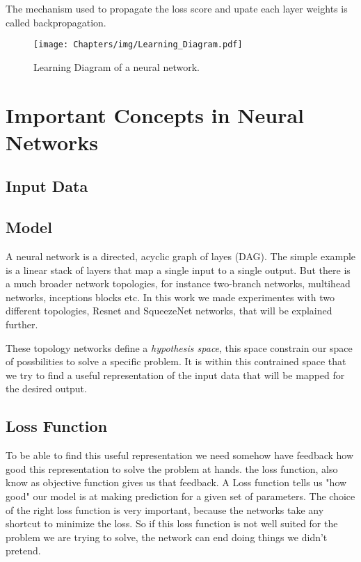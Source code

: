 The mechanism used to propagate the loss score and upate each layer weights is called backpropagation.

\begin{figure}[H]
    \centering
    \texttt{[image: Chapters/img/Learning\_Diagram.pdf]}
    \caption{Learning Diagram of a neural network.}
    \label{fig:learning_diagram}
\end{figure}

\section{Important Concepts in Neural Networks}

\subsection{Input Data}

\subsection{Model}
A neural network is a directed, acyclic graph of layes (DAG). The simple example is a linear stack of layers that map a single input to a single output.
But there is a much broader network topologies, for instance two-branch networks, multihead networks, inceptions blocks etc. In this work we made experimentes with two different topologies, Resnet and SqueezeNet networks, that will be explained further.

These topology networks define a \emph{hypothesis space}, this space constrain our space of possbilities to solve a specific problem. It is within this contrained space that we try to find a useful representation of the input data that will be mapped for the desired output.

\subsection{Loss Function}

To be able to find this useful representation we need somehow have feedback how good this representation to solve the problem at hands. the loss function, also know as objective function gives us that feedback. A Loss function tells us "how good" our model is at making prediction for a given set of parameters.
The choice of the right loss function is very important, because the networks take any shortcut to minimize the loss. So if this loss function is not well suited for the problem we are trying to solve, the network can end doing things we didn't pretend.

